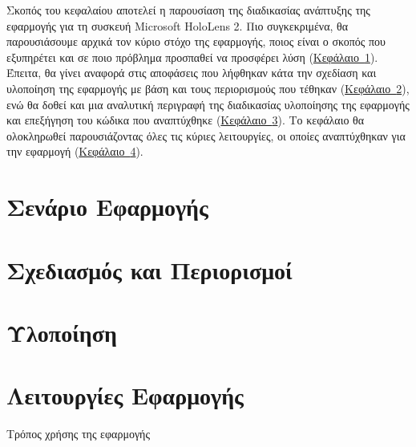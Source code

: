
Σκοπός του κεφαλαίου αποτελεί η παρουσίαση της διαδικασίας ανάπτυξης της εφαρμογής για τη συσκευή Microsoft HoloLens 2. Πιο συγκεκριμένα, θα παρουσιάσουμε αρχικά τον κύριο στόχο της εφαρμογής, ποιος είναι ο σκοπός που εξυπηρέτει και σε ποιο πρόβλημα προσπαθεί να προσφέρει λύση (\hyperref[sec:appScenario]{Κεφάλαιο~\ref*{sec:appScenario}}). Έπειτα, θα γίνει αναφορά στις αποφάσεις που λήφθηκαν κάτα την σχεδίαση και υλοποίηση της εφαρμογής με βάση και τους περιορισμούς που τέθηκαν (\hyperref[sec:appDesignAndLimitations]{Κεφάλαιο~\ref*{sec:appDesignAndLimitations}}), ενώ θα δοθεί και μια αναλυτική περιγραφή της διαδικασίας υλοποίησης της εφαρμογής και επεξήγηση του κώδικα που αναπτύχθηκε (\hyperref[sec:appImplementation]{Κεφάλαιο~\ref*{sec:appImplementation}}). Το κεφάλαιο θα ολοκληρωθεί παρουσιάζοντας όλες τις κύριες λειτουργίες, οι οποίες αναπτύχθηκαν για την εφαρμογή (\hyperref[sec:appFunctionalities]{Κεφάλαιο~\ref*{sec:appFunctionalities}}).

\section{Σενάριο Εφαρμογής}\label{sec:appScenario}


\section{Σχεδιασμός και Περιορισμοί}\label{sec:appDesignAndLimitations}


\section{Υλοποίηση}\label{sec:appImplementation}


\section{Λειτουργίες Εφαρμογής}\label{sec:appFunctionalities}
Τρόπος χρήσης της εφαρμογής

